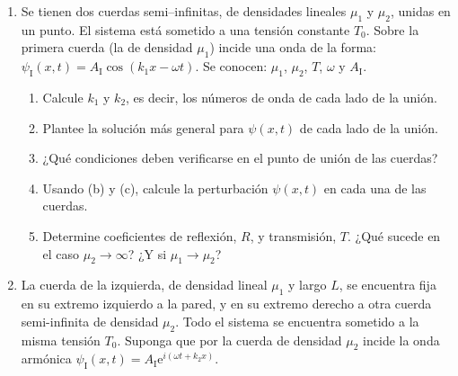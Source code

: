 \documentclass[11pt,spanish]{article}
\begin{document}
\begin{enumerate}

\section*{Reflexión y transmisión en cuerdas}



    \item Se tienen dos cuerdas semi--infinitas, de densidades lineales
    $\mu_{1}$ y $\mu_{2}$, unidas en un punto. El sistema está sometido a una
    tensión constante $T_0$. Sobre la primera cuerda (la de densidad $\mu_{1}$)
    incide una onda de la forma:
    $\psi_\text{I}(x,t)=A_\text{I}\cos\left(k_{1}x-\omega t\right)$. Se
    conocen: $\mu_{1}$, $\mu_{2}$, $T$, $\omega$ y $A_\text{I}$.

    \begin{figure}[H]
    \centering
    \end{figure}

    \begin{enumerate}
        \item Calcule $k_{1}$ y $k_{2}$, es decir, los números de onda de cada
        lado de la unión.
        \item Plantee la solución más general para $\psi(x,t)$ de cada lado de
        la unión.
        \item ¿Qué condiciones deben verificarse en el punto de unión de las
        cuerdas?
        \item Usando (b) y (c), calcule la perturbación $\psi(x,t)$ en cada una
        de las cuerdas. 
        \item Determine coeficientes de reflexión, $R$, y transmisión, $T$.
        ¿Qué sucede en el caso \(\mu_{2} \rightarrow \infty\)? ¿Y si
        \(\mu_{1} \to \mu_{2}\)? 
    \end{enumerate}


    \item La cuerda de la izquierda, de densidad lineal \(\mu_1\) y largo \(L\),
    se encuentra fija en su extremo izquierdo a la pared, y en su extremo
    derecho a otra cuerda semi-infinita de densidad \(\mu_2\). Todo el
    sistema se encuentra sometido a la misma tensión \(T_0\). Suponga que por
    la cuerda de densidad \(\mu_2\) incide la onda armónica
    \(\psi_\text{I}(x,t) = A_\text{I} \mathrm{e}^{i (\omega t + k_2 x) }\).


\end{enumerate}
\end{document}
